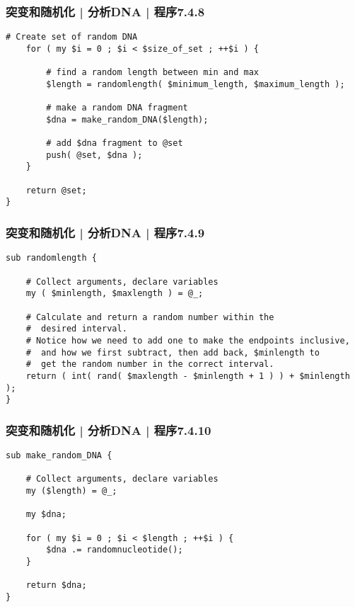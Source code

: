 \begin{frame}[fragile]
  \frametitle{突变和随机化 | 分析DNA | 程序7.4.8}
  \vspace{-1.5em}
\begin{lstlisting}[firstnumber=103,basicstyle=\small\tt]
    # Create set of random DNA
    for ( my $i = 0 ; $i < $size_of_set ; ++$i ) {

        # find a random length between min and max
        $length = randomlength( $minimum_length, $maximum_length );

        # make a random DNA fragment
        $dna = make_random_DNA($length);

        # add $dna fragment to @set
        push( @set, $dna );
    }

    return @set;
}
\end{lstlisting}
\end{frame}

\begin{frame}[fragile]
  \frametitle{突变和随机化 | 分析DNA | 程序7.4.9}
  \vspace{-1.5em}
\begin{lstlisting}[firstnumber=127,basicstyle=\small\tt]
sub randomlength {

    # Collect arguments, declare variables
    my ( $minlength, $maxlength ) = @_;

    # Calculate and return a random number within the
    #  desired interval.
    # Notice how we need to add one to make the endpoints inclusive,
    #  and how we first subtract, then add back, $minlength to
    #  get the random number in the correct interval.
    return ( int( rand( $maxlength - $minlength + 1 ) ) + $minlength );
}
\end{lstlisting}
\end{frame}

\begin{frame}[fragile]
  \frametitle{突变和随机化 | 分析DNA | 程序7.4.10}
  \vspace{-1.5em}
\begin{lstlisting}[firstnumber=147]
sub make_random_DNA {

    # Collect arguments, declare variables
    my ($length) = @_;

    my $dna;

    for ( my $i = 0 ; $i < $length ; ++$i ) {
        $dna .= randomnucleotide();
    }

    return $dna;
}
\end{lstlisting}
\end{frame}

